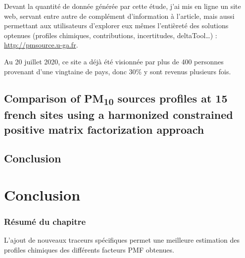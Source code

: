 \begin{tcolorbox}[colback=red!5!white,colframe=Melon,title=Note]
    Devant la quantité de donnée générée par cette étude, j'ai mis en ligne un site web,
    servant entre autre de complément d'information à l'article, mais aussi permettant aux
    utilisateurs d'explorer eux mêmes l'entièreté des solutions optenues (profiles
    chimiques, contributions, incertitudes, deltaTool…) : \url{http://pmsource.u-ga.fr}.

    Au 20 juillet 2020, ce site a déjà été visionnée par plus de 400 personnes provenant
    d'une vingtaine de pays, donc 30\% y sont revenus plusieurs fois.
\end{tcolorbox}

\subsection{Comparison of PM\textsubscript{10} sources profiles at 15 french sites using a harmonized constrained positive matrix factorization approach}%
\label{sub:article}



\subsection{Conclusion}%
\label{sub:conclusion}

%
% 


\section{Conclusion}%
\label{sec:conclusion}

\subsubsection{Résumé du chapitre}%
\label{ssub:résumé_du_chapitre}

L'ajout de nouveaux traceurs spécifiques permet une meilleure estimation des profiles
chimiques des différents facteurs PMF obtenues. 

